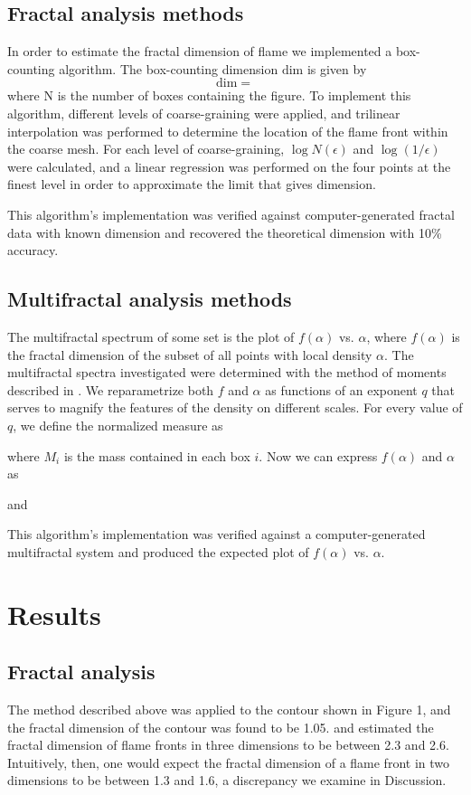 \documentclass[iop]{emulateapj}
\begin{document}
\subsection{Fractal analysis methods}\label{FractalMethods}
In order to estimate the fractal dimension of flame we implemented a box-counting algorithm. The box-counting dimension $\mathrm{dim}$ is given by
\begin{equation}
	\mathrm{dim} = 
\end{equation}
where N is the number of boxes containing the figure.  To implement this algorithm, different levels of coarse-graining were applied, and trilinear interpolation was performed to determine the location of the flame front within the coarse mesh. For each level of coarse-graining, $\log{N(\epsilon)}$ and $\log{(1/\epsilon)}$ were calculated, and a linear regression was performed on the four points at the finest level in order to approximate the limit that gives dimension.

This algorithm’s implementation was verified against computer-generated fractal data with known dimension and recovered the theoretical dimension with 10\% accuracy.

\subsection{Multifractal analysis methods}\label{MultifractalMethods}
The multifractal spectrum of some set is the plot of $f(\alpha)$ vs. $\alpha$, where $f(\alpha)$ is the fractal dimension of the subset of all points with local density $\alpha$. The multifractal spectra investigated were determined with the method of moments described in \cite{Chhabra1989}. We reparametrize both $f$ and $\alpha$ as functions of an exponent $q$ that serves to magnify the features of the density on different scales. For every value of $q$, we define the normalized measure as

where $M_i$ is the mass contained in each box $i$. Now we can express $f(\alpha)$ and $\alpha$ as

and

This algorithm’s implementation was verified against a computer-generated multifractal system and produced the expected plot of $f(\alpha)$ vs. $\alpha$.

\section{Results}\label{Results}

\subsection{Fractal analysis}\label{FractalResults}
The method described above was applied to the contour shown in Figure 1, and the fractal dimension of the contour was found to be 1.05. \cite{Timmes1994} and \cite{Blinnikov1996} estimated the fractal dimension of flame fronts in three dimensions to be between 2.3 and 2.6. Intuitively, then, one would expect the fractal dimension of a flame front in two dimensions to be between 1.3 and 1.6, a discrepancy we examine in Discussion.
\end{document}
